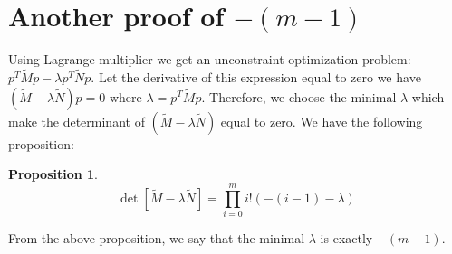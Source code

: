 \documentclass{article}
\newtheorem{proposition}{Proposition}
\begin{document}
\section{Another proof of $-(m-1)$}
Using Lagrange multiplier we get an unconstraint optimization problem:
$p^T \widetilde{M} p - \lambda p^T \widetilde{N} p $. Let the derivative of this expression equal to zero
we have $(\widetilde{M}-\lambda \widetilde{N})p=0$ where $\lambda = p^T \widetilde{M} p$.
Therefore, we choose the minimal $\lambda$ which make the determinant of $(\widetilde{M}-\lambda \widetilde{N})$ equal to zero.
We have the following proposition:
\begin{proposition}
\begin{equation}
\det[\widetilde{M}-\lambda \widetilde{N}] = \prod_{i=0}^m i!(-(i-1) - \lambda)
\end{equation}
\end{proposition}
From the above proposition, we say that the minimal $\lambda$ is exactly $-(m-1)$.


\end{document}
